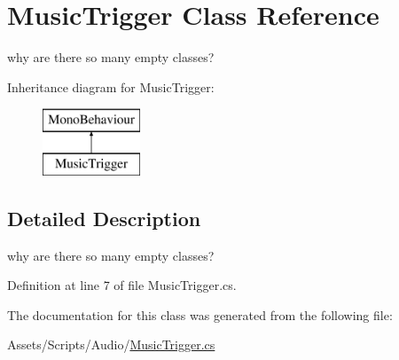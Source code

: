 \hypertarget{class_music_trigger}{}\section{Music\+Trigger Class Reference}
\label{class_music_trigger}


why are there so many empty classes?  


Inheritance diagram for Music\+Trigger\+:\begin{figure}[H]
\begin{center}
\leavevmode
\includegraphics[height=2.000000cm]{class_music_trigger}
\end{center}
\end{figure}


\subsection{Detailed Description}
why are there so many empty classes? 



Definition at line 7 of file Music\+Trigger.\+cs.



The documentation for this class was generated from the following file\+:\begin{DoxyCompactItemize}
\item 
Assets/\+Scripts/\+Audio/\mbox{\hyperlink{_music_trigger_8cs}{Music\+Trigger.\+cs}}\end{DoxyCompactItemize}
